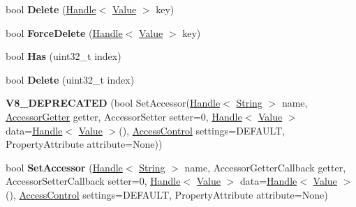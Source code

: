 \begin{DoxyCompactItemize}
\item 
\hypertarget{classv8_1_1_object_a6850815e31ba9fc75d368c69892cfd8b}{}bool {\bfseries Delete} (\hyperlink{classv8_1_1_handle}{Handle}$<$ \hyperlink{classv8_1_1_value}{Value} $>$ key)\label{classv8_1_1_object_a6850815e31ba9fc75d368c69892cfd8b}

\item 
\hypertarget{classv8_1_1_object_a8e7f3b8b70eb17bcb5cc087d5b6746d6}{}bool {\bfseries Force\+Delete} (\hyperlink{classv8_1_1_handle}{Handle}$<$ \hyperlink{classv8_1_1_value}{Value} $>$ key)\label{classv8_1_1_object_a8e7f3b8b70eb17bcb5cc087d5b6746d6}

\item 
\hypertarget{classv8_1_1_object_ac547af2f2d256d96991ff20159a44bfd}{}bool {\bfseries Has} (uint32\+\_\+t index)\label{classv8_1_1_object_ac547af2f2d256d96991ff20159a44bfd}

\item 
\hypertarget{classv8_1_1_object_a63f88a22cb5d994eedc1efc79520bc42}{}bool {\bfseries Delete} (uint32\+\_\+t index)\label{classv8_1_1_object_a63f88a22cb5d994eedc1efc79520bc42}

\item 
\hypertarget{classv8_1_1_object_a0d21384fc6c37e8df30d202c58b3c1db}{}{\bfseries V8\+\_\+\+D\+E\+P\+R\+E\+C\+A\+T\+E\+D} (bool Set\+Accessor(\hyperlink{classv8_1_1_handle}{Handle}$<$ \hyperlink{classv8_1_1_string}{String} $>$ name, \hyperlink{namespacev8_a3016fe071826349d1370a700e71be094}{Accessor\+Getter} getter, Accessor\+Setter setter=0, \hyperlink{classv8_1_1_handle}{Handle}$<$ \hyperlink{classv8_1_1_value}{Value} $>$ data=\hyperlink{classv8_1_1_handle}{Handle}$<$ \hyperlink{classv8_1_1_value}{Value} $>$(), \hyperlink{namespacev8_a31d8355cb043d7d2dda3f4a52760b64e}{Access\+Control} settings=D\+E\+F\+A\+U\+L\+T, Property\+Attribute attribute=None))\label{classv8_1_1_object_a0d21384fc6c37e8df30d202c58b3c1db}

\item 
\hypertarget{classv8_1_1_object_a7590761426aae338f6ab308ff65d491c}{}bool {\bfseries Set\+Accessor} (\hyperlink{classv8_1_1_handle}{Handle}$<$ \hyperlink{classv8_1_1_string}{String} $>$ name, Accessor\+Getter\+Callback getter, Accessor\+Setter\+Callback setter=0, \hyperlink{classv8_1_1_handle}{Handle}$<$ \hyperlink{classv8_1_1_value}{Value} $>$ data=\hyperlink{classv8_1_1_handle}{Handle}$<$ \hyperlink{classv8_1_1_value}{Value} $>$(), \hyperlink{namespacev8_a31d8355cb043d7d2dda3f4a52760b64e}{Access\+Control} settings=D\+E\+F\+A\+U\+L\+T, Property\+Attribute attribute=None)\label{classv8_1_1_object_a7590761426aae338f6ab308ff65d491c}


\end{DoxyCompactItemize}
